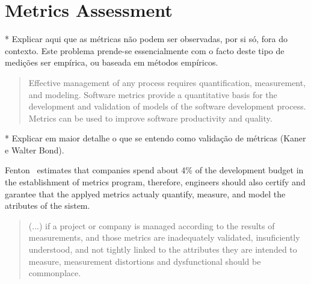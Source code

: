 \section{Metrics Assessment} \label{assess}





    * Explicar aqui que as métricas não podem ser observadas, por si só, fora do contexto. Este problema prende-se essencialmente com o facto deste tipo de medições ser empírica, ou baseada em métodos empíricos.

\begin{quotation}
	Effective management of any process requires quantification, measurement, and modeling. Software metrics provide a quantitative basis for the development and validation of models of the software development process. Metrics can be used to improve software productivity and quality.~\cite{g1:Millis:1998}
\end{quotation}

    * Explicar em maior detalhe o que se entendo como validação de métricas (Kaner e Walter Bond).


Fenton~\cite{g1:Fenton:1999} estimates that companies spend about 4\% of the development budget in the establishment of metrics program, therefore, engineers should also certify and garantee that the applyed metrics actualy quantify, measure, and model the atributes of the sistem.
\begin{quotation}
	(...) if a project or company is managed according to the results of measurements, and those metrics are inadequately validated, insuficiently understood, and not tightly linked to the attributes they are intended to measure, measurement distortions and dysfunctional should be commonplace.~\cite{g1:kaner:2004}
\end{quotation}


